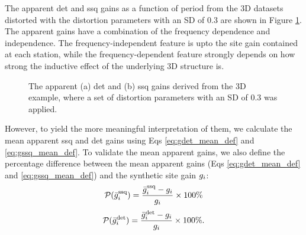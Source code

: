 The apparent det and ssq gains as a function of period from the 3D datasets distorted with the distortion parameters with an SD of 0.3 are shown in Figure \ref{fig:appgain_3d_distorted}.
The apparent gains have a combination of the frequency dependence and independence.
The frequency-independent feature is upto the site gain contained at each station, while the frequency-dependent feature strongly depends on how strong the inductive effect of the underlying 3D structure is.



\begin{figure}[t]
	\centering
	\caption[Apparent det and ssq gains from 3D dataset]{The apparent (a) det and (b) ssq gains derived from the 3D example, where a set of distortion parameters with an SD of 0.3 was applied.}
	\label{fig:appgain_3d_distorted}
\end{figure}

However, to yield the more meaningful interpretation of them,
we calculate the mean apparent ssq and det gains using Eqs \eqref{eq:gdet_mean_def} and \eqref{eq:gssq_mean_def}. 
To validate the mean apparent gains, we also define the percentage difference between the mean apparent gains (Eqs \ref{eq:gdet_mean_def} and \ref{eq:gssq_mean_def}) and the synthetic site gain $g_i$:
	\begin{equation}
		\mathcal{P}(\bar{g}^{\mathrm{ssq}}_i) = \frac{\bar{g}^{\mathrm{ssq}}_i - g_i}{g_i} \times 100\%
	\end{equation}	
	\begin{equation}
		\mathcal{P}(\bar{g}^{\mathrm{det}}_i) = \frac{\bar{g}^{\mathrm{det}}_i - g_i}{g_i} \times 100\%.
	\end{equation}

